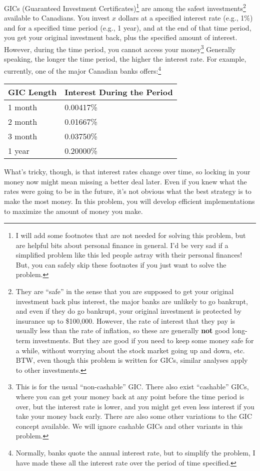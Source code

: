 \documentclass[11pt]{article}
\begin{document}
GICs (Guaranteed Investment Certificates)\footnote{
I will add some footnotes that are
not needed for solving this problem, but are helpful bits about personal
finance in general.  I'd be very sad if a simplified problem like this
led people astray with their personal finances!  But, you can safely
skip these footnotes if you just want to solve the problem.}
are among the safest investments\footnote{
They are ``safe'' in the sense that you are supposed to get your original
investment back plus interest,
the major banks are unlikely to go bankrupt,
and even if they do go bankrupt, your original investment is protected
by insurance up to \$100,000.  However, the rate of interest that they
pay is usually less than the rate of inflation, so these are generally
\textbf{not} good long-term investments.  But they are good if you need
to keep some money safe for a while, without worrying about the stock
market going up and down, etc.  BTW, even though this problem is written
for GICs, similar analyses apply to other investments.}
available to Canadians.
You invest $x$ dollars at a specified interest rate (e.g., 1\%)
and for a specified time period (e.g., 1 year), and at the end of that
time period, you get your original investment back, plus the specified
amount of interest.  However, during the time period, you cannot
access your money\footnote{This is for the usual ``non-cashable'' GIC.
There also exist ``cashable'' GICs, where you can get your money back
at any point before the time period is over, but the interest rate is
lower, and you might get even less interest if you take your money back
early.  There are also some other variations to the GIC concept available.
We will ignore cashable GICs and other variants in this problem.}
Generally speaking, the longer the time period, the higher the interest rate.
For example, currently, one of the major Canadian banks offers:\footnote{
Normally, banks quote the annual interest rate, but to simplify the problem,
I have made these all the interest rate over the period of time specified.}
\begin{center}
\begin{tabular}{l|l}
GIC Length & Interest During the Period \\ \hline
1 month & 0.00417\% \\
2 month & 0.01667\% \\
3 month & 0.03750\% \\
1 year &  0.20000\%
\end{tabular}
\end{center}
What's tricky, though, is that
interest rates change over time, so locking in your
money now might mean missing a better deal later.
Even if you knew what the rates were going to be in the future, it's
not obvious what the best strategy is to make the most money.
In this problem, you will develop efficient implementations to
maximize the amount of money you make.
\end{document}
